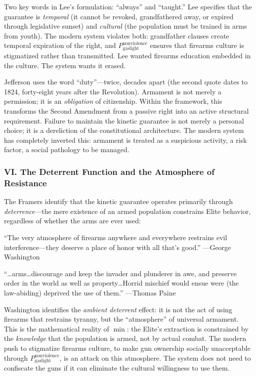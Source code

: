 \documentclass[12pt,openany]{book}
\begin{document}
Two key words in Lee's formulation: ``always'' and ``taught.'' Lee specifies that the guarantee is \textit{temporal} (it cannot be revoked, grandfathered away, or expired through legislative sunset) and \textit{cultural} (the population must be trained in arms from youth). The modern system violates both: grandfather clauses create temporal expiration of the right, and $P_{\text{gaslight}}^{\text{nonviolence}}$ ensures that firearms culture is stigmatized rather than transmitted. Lee wanted firearms education embedded in the culture. The system wants it erased.

Jefferson uses the word ``duty''---twice, decades apart (the second quote dates to 1824, forty-eight years after the Revolution). Armament is not merely a permission; it is an \textit{obligation} of citizenship. Within the framework, this transforms the Second Amendment from a passive right into an active structural requirement. Failure to maintain the kinetic guarantee is not merely a personal choice; it is a dereliction of the constitutional architecture. The modern system has completely inverted this: armament is treated as a suspicious activity, a risk factor, a social pathology to be managed.

\subsubsection*{VI. The Deterrent Function and the Atmosphere of Resistance}

The Framers identify that the kinetic guarantee operates primarily through \textit{deterrence}---the mere existence of an armed population constrains Elite behavior, regardless of whether the arms are ever used:

\begin{historicalsource}
``The very atmosphere of firearms anywhere and everywhere restrains evil interference---they deserve a place of honor with all that's good.'' \hfill ---George Washington

\medskip
``\ldots arms\ldots discourage and keep the invader and plunderer in awe, and preserve order in the world as well as property\ldots Horrid mischief would ensue were (the law-abiding) deprived the use of them.'' \hfill ---Thomas Paine
\end{historicalsource}

Washington identifies the \textit{ambient deterrent} effect: it is not the act of using firearms that restrains tyranny, but the ``atmosphere'' of universal armament. This is the mathematical reality of $\min$: the Elite's extraction is constrained by the \textit{knowledge} that the population is armed, not by actual combat. The modern push to stigmatize firearms culture, to make gun ownership socially unacceptable through $P_{\text{gaslight}}^{\text{nonviolence}}$, is an attack on this atmosphere. The system does not need to confiscate the guns if it can eliminate the cultural willingness to use them.
\end{document}
